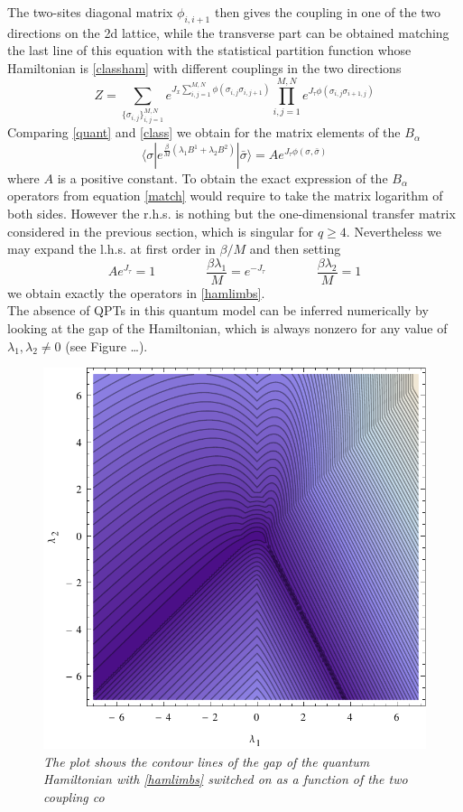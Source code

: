 \documentclass[aps,pra,superscriptaddress]{revtex4}
\newcommand\be            {\begin{equation}}
\newcommand\ee            {\end{equation}}
\renewcommand{\(}{\left(}
\renewcommand{\)}{\right)}
\renewcommand{\[}{\left[}
\renewcommand{\]}{\right]}
\newcommand\braket[3]{\langle #1 | #2 | #3 \rangle }
\begin{document}
The two-sites diagonal matrix $\phi_{i,i+1}$ then gives the coupling in one of the two directions on the 2d lattice, while the transverse part can be obtained matching the last line of this equation with the statistical partition function whose Hamiltonian is \eqref{classham} with different couplings in the two directions
\be \label{class}
Z = \sum_{ \{ \sigma_{i,j} \}_{i,j=1}^{M,N} } e^{ J_x \sum_{i,j=1}^{M,N} \phi (\sigma_{i,j}\sigma_{i,j+1}) } \prod_{i,j=1}^{M,N} e^{ J_\tau \phi (\sigma_{i,j}\sigma_{i+1,j}) }
\ee
Comparing \eqref{quant} and \eqref{class} we obtain for the matrix elements of the $B_\alpha$
\be \label{match}
\braket{ \sigma   }{ e^{  \frac{\beta}{M} ( \lambda_1 B^1 + \lambda_2 B^2 ) } }{ \bar{\sigma}  } =  A e^{ J_\tau \phi (\sigma,\bar{\sigma}) }
\ee
where $A$ is a positive constant. To obtain the exact expression of the $B_\alpha$ operators from equation \eqref{match} would require to take the matrix logarithm of both sides. However the r.h.s. is nothing but the one-dimensional transfer matrix considered in the previous section, which is singular for $q\ge 4$. Nevertheless we may expand the l.h.s. at first order in $\beta/M$ and then setting
\be 
A e^{J_\tau} = 1
\qquad \qquad
\frac{\beta \lambda_1}{M} = e^{-J_\tau }
\qquad \qquad
\frac{\beta \lambda_2}{M} = 1
\ee
we obtain exactly the operators in \eqref{hamlimbs}.\\
The absence of QPTs in this quantum model can be inferred numerically by looking at the gap of the Hamiltonian, which is always nonzero for any value of $\lambda_1,\lambda_2 \ne 0$ (see Figure \dots ).
\begin{figure}[H]
\center
\includegraphics[scale=0.7]{Figures/hamgap.pdf}
\caption{{\em The plot shows the contour lines of the gap of the quantum Hamiltonian with \eqref{hamlimbs} switched on as a function of the two coupling co}}
\label{f1d}
\end{figure}
\end{document}
